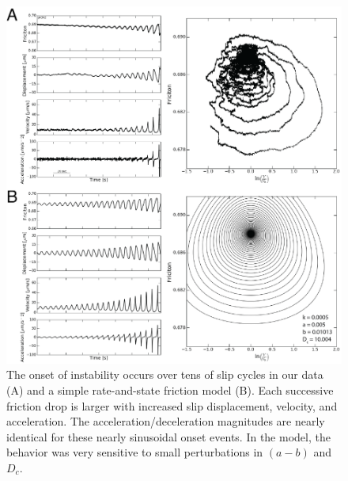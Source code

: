 \begin{figure}[H]
	\centering
		\includegraphics[scale=1.0]{chap_slow_slip_details/Figure_10.png}
   	\caption{The onset of instability occurs over tens of slip cycles in our data (A) and a simple rate-and-state friction model (B). Each successive friction drop is larger with increased slip displacement, velocity, and acceleration. The acceleration/deceleration magnitudes are nearly identical for these nearly sinusoidal onset events. In the model, the behavior was very sensitive to small perturbations in $(a-b)$ and $D_c$.}
  	\label{Figure_10}
\end{figure}

\clearpage

